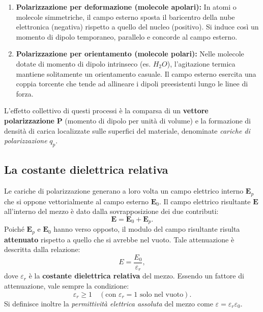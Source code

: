 \documentclass[a4paper,11pt]{report}
\begin{document}
\begin{enumerate}
    \item \textbf{Polarizzazione per deformazione (molecole apolari):} In atomi o molecole simmetriche, il campo esterno sposta il baricentro della nube elettronica (negativa) rispetto a quello del nucleo (positivo). Si induce così un momento di dipolo temporaneo, parallelo e concorde al campo esterno.
    \item \textbf{Polarizzazione per orientamento (molecole polari):} Nelle molecole dotate di momento di dipolo intrinseco (es. $H_2O$), l'agitazione termica mantiene solitamente un orientamento casuale. Il campo esterno esercita una coppia torcente che tende ad allineare i dipoli preesistenti lungo le linee di forza.
\end{enumerate}

L'effetto collettivo di questi processi è la comparsa di un \textbf{vettore polarizzazione} $\bm{P}$ (momento di dipolo per unità di volume) e la formazione di densità di carica localizzate sulle superfici del materiale, denominate \textit{cariche di polarizzazione} $q_p$.

\subsection{La costante dielettrica relativa}
Le cariche di polarizzazione generano a loro volta un campo elettrico interno $\bm{E}_p$ che si oppone vettorialmente al campo esterno $\bm{E}_0$.
Il campo elettrico risultante $\bm{E}$ all'interno del mezzo è dato dalla sovrapposizione dei due contributi:
\begin{equation}
    \bm{E} = \bm{E}_0 + \bm{E}_p.
    \label{eq:campo_dielettrico}
\end{equation}
Poiché $\bm{E}_p$ e $\bm{E}_0$ hanno verso opposto, il modulo del campo risultante risulta \textbf{attenuato} rispetto a quello che si avrebbe nel vuoto. Tale attenuazione è descritta dalla relazione:
\begin{equation}
    E = \frac{E_0}{\varepsilon_r},
\end{equation}
dove $\varepsilon_r$ è la \textbf{costante dielettrica relativa} del mezzo. Essendo un fattore di attenuazione, vale sempre la condizione:
\begin{equation}
    \varepsilon_r \ge 1 \quad (\text{con } \varepsilon_r = 1 \text{ solo nel vuoto}).
\end{equation}
Si definisce inoltre la \textit{permittività elettrica assoluta} del mezzo come $\varepsilon = \varepsilon_r \varepsilon_0$.
\end{document}
